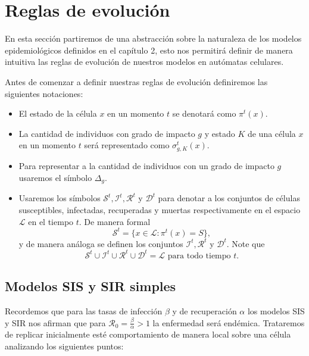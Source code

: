 \section{Reglas de evolución}

En esta sección partiremos de una abstracción sobre la naturaleza de los modelos epidemiológicos definidos en el capítulo 2, esto nos permitirá definir de manera intuitiva las reglas de evolución de nuestros modelos en autómatas celulares.

Antes de comenzar a definir nuestras reglas de evolución definiremos las siguientes notaciones:
\begin{itemize}
    \item El estado de la célula $x$ en un momento $t$ se denotará como $\pi^t(x)$.
    \item La cantidad de individuos con grado de impacto $g$ y estado $K$ de una célula $x$ en un momento $t$ será representado como $\sigma_{g,K}^t(x)$.
    \item Para representar a la cantidad de individuos con un grado de impacto $g$ usaremos el símbolo $\Delta_g$. 
    \item Usaremos los símbolos $\mathcal{S}^t,\mathcal{I}^t,\mathcal{R}^t$ y $\mathcal{D}^t$ para denotar a los conjuntos de células susceptibles, infectadas, recuperadas y muertas respectivamente en el espacio $\mathcal{L}$ en el tiempo $t$. De manera formal
    $$\mathcal{S}^t=\{x\in\mathcal{L}:\pi^t(x)=S\},$$
    y de manera análoga se definen los conjuntos $\mathcal{I}^t,\mathcal{R}^t$ y $\mathcal{D}^t$. Note que $$\mathcal{S}^t\cup\mathcal{I}^t\cup\mathcal{R}^t\cup\mathcal{D}^t=\mathcal{L}\text{ para todo tiempo }t.$$
\end{itemize}

\subsection{Modelos SIS y SIR simples}

Recordemos que para las tasas de infección $\beta$ y de recuperación $\alpha$ los modelos SIS y SIR nos afirman que para $\mathcal{R}_0=\frac{\beta}{\alpha}>1$ la enfermedad será endémica. Trataremos de replicar inicialmente esté comportamiento de manera local sobre una célula analizando los siguientes puntos:

